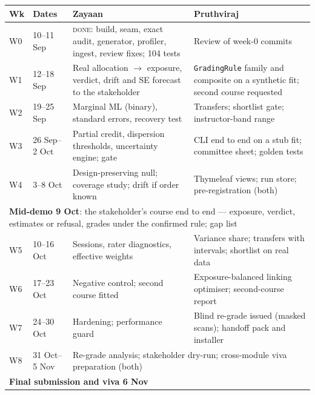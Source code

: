 \documentclass[10pt,a4paper]{article}
\begin{document}
\begin{center}\small
\begin{tabular}{|l|l|p{6.0cm}|p{6.0cm}|}
\hline
\textbf{Wk} & \textbf{Dates} & \textbf{Zayaan} & \textbf{Pruthviraj} \\
\hline
W0 & 10--11 Sep & \raggedright \textsc{done}: build, seam, exact audit, generator, profiler, ingest, review fixes; 104 tests & \raggedright Review of week-0 commits \tabularnewline
W1 & 12--18 Sep & \raggedright Real allocation $\rightarrow$ exposure, verdict, drift and SE forecast to the stakeholder & \raggedright \texttt{GradingRule} family and composite on a synthetic fit; second course requested \tabularnewline
W2 & 19--25 Sep & \raggedright Marginal ML (binary), standard errors, recovery test & \raggedright Transfers; shortlist gate; instructor-band range \tabularnewline
W3 & 26 Sep--2 Oct & \raggedright Partial credit, dispersion thresholds, uncertainty engine; gate & \raggedright CLI end to end on a stub fit; committee sheet; golden tests \tabularnewline
W4 & 3--8 Oct & \raggedright Design-preserving null; coverage study; drift if order known & \raggedright Thymeleaf views; run store; pre-registration (both) \tabularnewline
\multicolumn{4}{|p{16.0cm}|}{\raggedright \textbf{Mid-demo 9 Oct}: the stakeholder's course end to end --- exposure, verdict, estimates or refusal, grades under the confirmed rule; gap list} \tabularnewline
W5 & 10--16 Oct & \raggedright Sessions, rater diagnostics, effective weights & \raggedright Variance share; transfers with intervals; shortlist on real data \tabularnewline
W6 & 17--23 Oct & \raggedright Negative control; second course fitted & \raggedright Exposure-balanced linking optimiser; second-course report \tabularnewline
W7 & 24--30 Oct & \raggedright Hardening; performance guard & \raggedright Blind re-grade issued (masked scans); handoff pack and installer \tabularnewline
W8 & 31 Oct--5 Nov & \multicolumn{2}{p{12.3cm}|}{\raggedright Re-grade analysis; stakeholder dry-run; cross-module viva preparation (both)} \tabularnewline
\multicolumn{4}{|l|}{\textbf{Final submission and viva 6 Nov}} \tabularnewline
\hline
\end{tabular}
\end{center}
\end{document}
